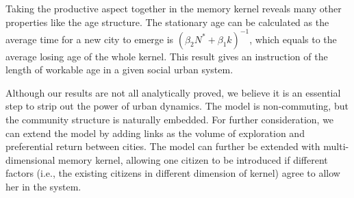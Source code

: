 \documentclass[reprint,unsortedaddress,amsmath,amssymb,aps,prl,showkeys]{revtex4-2}
\begin{document}
Taking the productive aspect together in the memory kernel reveals many other properties like the age structure. The stationary age can be calculated as the average time for a new city to emerge is $(\beta_2 N^* + \beta_1 k)^{-1}$, which equals to the average losing age of the whole kernel. This result gives an instruction of the length of workable age in a given social urban system.

Although our results are not all analytically proved, we believe it is an essential step to strip out the power of urban dynamics. The model is non-commuting, but the community structure is naturally embedded. For further consideration, we can extend the model by adding links as the volume of exploration and preferential return between cities\cite{WANG2019121921}. The model can further be extended with multi-dimensional memory kernel, allowing one citizen to be introduced if different factors\cite{tokita2020social} (i.e., the existing citizens in different dimension of kernel) agree to allow her in the system.




\end{document}
